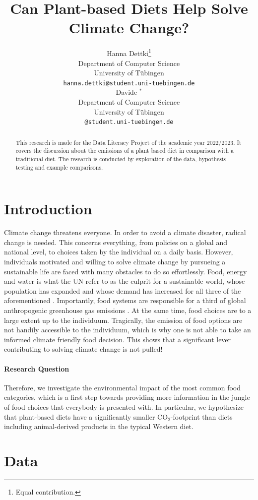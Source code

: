 \documentclass{article}
\title{Can Plant-based Diets Help Solve Climate Change?}
\author{%
  Hanna Dettki\thanks{Equal contribution.} \\
  Department of Computer Science\\
  University of Tübingen\\
  \texttt{hanna.dettki@student.uni-tuebingen.de} \\
  \And
  Davide $^{*}$  \\
  Department of Computer Science\\
  University of Tübingen\\
  \texttt{@student.uni-tuebingen.de} \\
}
\begin{document}
\maketitle

\begin{abstract}
  This research is made for the Data Literacy Project of the academic year 2022/2023. It covers the discussion about the emissions of a plant based diet in comparison with a traditional diet. The research is conducted by exploration of the data, hypothesis testing and example comparisons. 
\end{abstract}

\section{Introduction}

Climate change threatens everyone. In order to avoid a climate disaster, radical change is needed. This concerns everything, from policies on a global and national level, to choices taken by the individual on a daily basis. 
However, individuals motivated and willing to solve climate change by pursueing a sustainable life are faced with many obstacles to do so effortlessly. Food, energy and water is what the UN refer to as the culprit for a sustainable world, whose population has expanded and whose demand has increased for all three of the aforementioned  \cite{Ritchie2020}.
 Importantly, food systems are responsible for a third of global anthropogenic greenhouse gas emissions \cite{Crippa2021}. At the same time, food choices are to a large extent up to the individuum.  Tragically,  the emission of food options are not handily accessible to the individuum, which is why one is not able to take an informed climate friendly food decision. This shows that a significant lever contributing to solving climate change is not pulled!
\paragraph*{Research Question}
Therefore, we investigate the environmental impact of the most common food categories, which is a first step towards  providing more information in the jungle of food choices that everybody is presented with. In particular, we hypothesize that  plant-based diets  have a significantly smaller CO$_2$-footprint than  diets including animal-derived products in the typical Western diet.

\section{Data}
\label{data}
\end{document}
